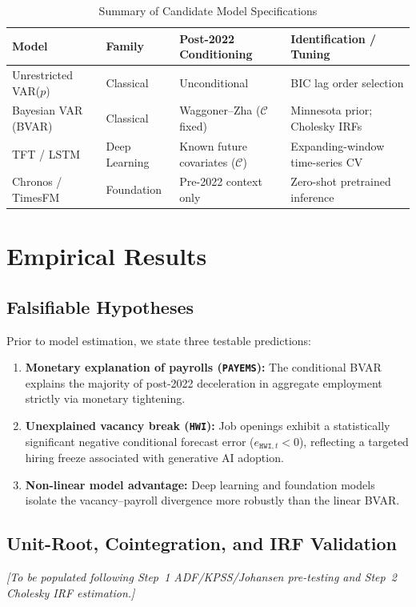 \documentclass[11pt,a4paper]{article}
\begin{document}
\begin{table}[htbp]
\centering
\caption{Summary of Candidate Model Specifications}
\label{tab:models}
\small
\begin{tabular}{@{}llll@{}}
\toprule
Model & Family & Post-2022 Conditioning & Identification / Tuning \\
\midrule
Unrestricted VAR($p$) & Classical & Unconditional & BIC lag order selection \\
Bayesian VAR (BVAR) & Classical & Waggoner--Zha ($\mathcal{C}$ fixed) & Minnesota prior; Cholesky IRFs \\
TFT / LSTM & Deep Learning & Known future covariates ($\mathcal{C}$) & Expanding-window time-series CV \\
Chronos / TimesFM & Foundation & Pre-2022 context only & Zero-shot pretrained inference \\
\bottomrule
\end{tabular}
\end{table}

\section{Empirical Results}
\label{sec:results}

\subsection{Falsifiable Hypotheses}
Prior to model estimation, we state three testable predictions:
\begin{enumerate}
  \item \textbf{Monetary explanation of payrolls (\texttt{PAYEMS}):} The conditional BVAR explains the majority of post-2022 deceleration in aggregate employment strictly via monetary tightening.
  \item \textbf{Unexplained vacancy break (\texttt{HWI}):} Job openings exhibit a statistically significant negative conditional forecast error ($e_{\texttt{HWI},t} < 0$), reflecting a targeted hiring freeze associated with generative AI adoption.
  \item \textbf{Non-linear model advantage:} Deep learning and foundation models isolate the vacancy--payroll divergence more robustly than the linear BVAR.
\end{enumerate}

\subsection{Unit-Root, Cointegration, and IRF Validation}
\textit{[To be populated following Step~1 ADF/KPSS/Johansen pre-testing and Step~2 Cholesky IRF estimation.]}
\end{document}
